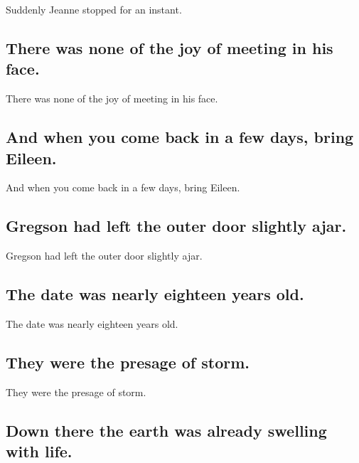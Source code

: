 \documentclass[]{article}
\begin{document}
Suddenly Jeanne stopped for an instant.

\hypertarget{there-was-none-of-the-joy-of-meeting-in-his-face.}{%
\subsection{There was none of the joy of meeting in his
face.}\label{there-was-none-of-the-joy-of-meeting-in-his-face.}}

There was none of the joy of meeting in his face.

\hypertarget{and-when-you-come-back-in-a-few-days-bring-eileen.}{%
\subsection{And when you come back in a few days, bring
Eileen.}\label{and-when-you-come-back-in-a-few-days-bring-eileen.}}

And when you come back in a few days, bring Eileen.

\hypertarget{gregson-had-left-the-outer-door-slightly-ajar.}{%
\subsection{Gregson had left the outer door slightly
ajar.}\label{gregson-had-left-the-outer-door-slightly-ajar.}}

Gregson had left the outer door slightly ajar.

\hypertarget{the-date-was-nearly-eighteen-years-old.}{%
\subsection{The date was nearly eighteen years
old.}\label{the-date-was-nearly-eighteen-years-old.}}

The date was nearly eighteen years old.

\hypertarget{they-were-the-presage-of-storm.}{%
\subsection{They were the presage of
storm.}\label{they-were-the-presage-of-storm.}}

They were the presage of storm.

\hypertarget{down-there-the-earth-was-already-swelling-with-life.}{%
\subsection{Down there the earth was already swelling with
life.}\label{down-there-the-earth-was-already-swelling-with-life.}}
\end{document}
